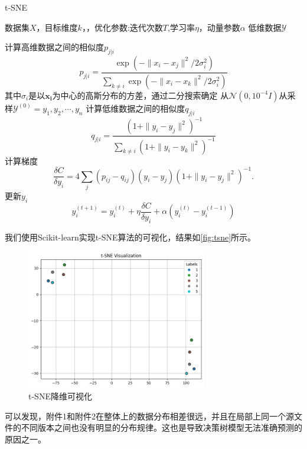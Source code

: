 \begin{algorithm}[H]
	\caption{t-SNE}
	\label{alg:tsne}
	\begin{algorithmic}
		\REQUIRE 数据集$X$，目标维度$k$，，优化参数:迭代次数$T$,学习率$\eta$，动量参数$\alpha$
		\ENSURE  低维数据$\mathcal{Y}$

		\STATE 计算高维数据之间的相似度$p_{j|
					i}$
		\[
		p_{j|i}=\frac{\exp\left(-\|x_i-x_j\|^2/2\sigma_i^2\right)}{\sum_{k\neq i}\exp\left(-\|x_i-x_k\|^2/2\sigma_i^2\right)}
		\]
		其中$\sigma_i$是以$\boldsymbol{x_i}$为中心的高斯分布的方差，通过二分搜索确定
		\STATE 从$\mathcal{N}(0,10^{-4}I)$从采样$\mathcal{Y}^{(0)}={y_1,y_2,\cdots,y_n}$
		\STATE 计算低维数据之间的相似度$q_{j|i}$
		\[q_{j|i}=\frac{(1+\|y_i-y_j\|^2)^{-1}}{\sum_{k\neq i}(1+\|y_i-y_k\|^2)^{-1}}\]
		\STATE 计算梯度
		\[
			\frac{\delta C}{\delta y_i}=4\sum_j(p_{ij}-q_{ij})(y_i-y_j)\left(1+\|y_i-y_j\|^2\right)^{-1}.
		\]
		\STATE 更新$y_i$
		\[
			y_i^{(t+1)}=y_i^{(t)}+\eta\frac{\delta C}{\delta y_i}+\alpha(y_i^{(t)}-y_i^{(t-1)})
		\]
		\ENDFOR
	\end{algorithmic}
\end{algorithm}
我们使用Scikit-learn\cite{scikit-learn}实现t-SNE算法的可视化，结果如\autoref{fig:tsne}所示。
\begin{figure}[H]
	\centering
	\includegraphics[width=0.7\textwidth]{figures/tsne.png}
	\caption{t-SNE降维可视化}
	\label{fig:tsne}
\end{figure}
可以发现，附件1和附件2在整体上的数据分布相差很远，并且在局部上同一个源文件的不同版本之间也没有明显的分布规律。这也是导致决策树模型无法准确预测的原因之一。
\vspace{1cm}
